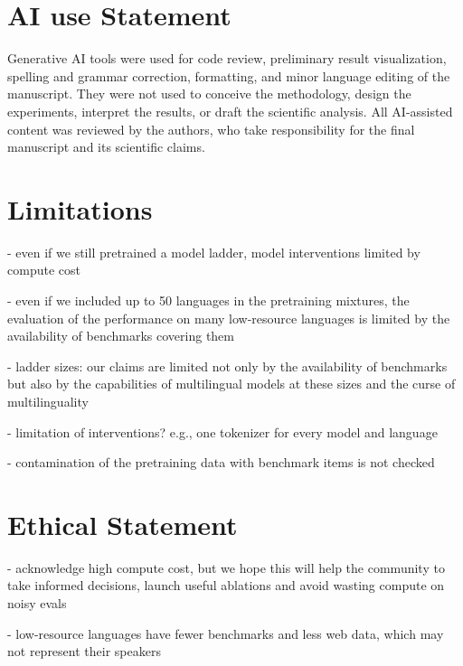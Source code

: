 \section*{AI use Statement}

Generative AI tools were used for code review, preliminary result visualization, spelling and grammar correction, formatting, and minor language editing of the manuscript. 
They were not used to conceive the methodology, design the experiments, interpret the results, or draft the scientific analysis. 
All AI-assisted content was reviewed by the authors, who take responsibility for the final manuscript and its scientific claims.

\section*{Limitations}

- even if we still pretrained a \nmodels model ladder, model interventions limited by compute cost

- even if we included up to 50 languages in the pretraining mixtures, the evaluation of the performance on many low-resource languages is limited by the availability of benchmarks covering them

- ladder sizes: our claims are limited not only by the availability of benchmarks but also by the capabilities of multilingual models at these sizes and the curse of multilinguality

- limitation of interventions? e.g., one tokenizer for every model and language

- contamination of the pretraining data with benchmark items is not checked

\section*{Ethical Statement}

- acknowledge high compute cost, but we hope this will help the community to take informed decisions, launch useful ablations and avoid wasting compute on noisy evals

- low-resource languages have fewer benchmarks and less web data, which may not represent their speakers
